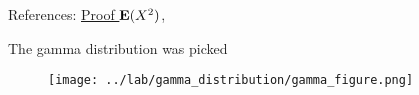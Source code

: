 
References: \href{http://herbsusmann.com/distributions/gamma-distribution-variance-proof.html}{Proof $\operatorname{\mathbf{E}}(X^2)$}, 

The gamma distribution was picked 

\begin{figure}[h!]
\centering
\texttt{[image: ../lab/gamma\_distribution/gamma\_figure.png]}
\end{figure}
